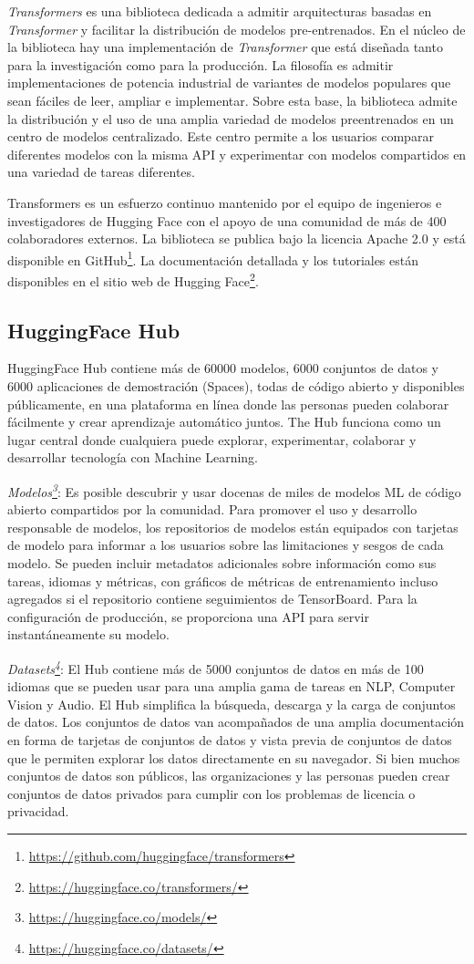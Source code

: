\textit{Transformers} es una biblioteca dedicada a admitir arquitecturas basadas en \textit{Transformer} y facilitar la distribución de modelos pre-entrenados. En el núcleo de la biblioteca hay una implementación de \textit{Transformer} que está diseñada tanto para la investigación como para la producción. La filosofía es admitir implementaciones de potencia industrial de variantes de modelos populares que sean fáciles de leer, ampliar e implementar. Sobre esta base, la biblioteca admite la distribución y el uso de una amplia variedad de modelos preentrenados en un centro de modelos centralizado. Este centro permite a los usuarios comparar diferentes modelos con la misma API y experimentar con modelos compartidos en una variedad de tareas diferentes.

Transformers es un esfuerzo continuo mantenido por el equipo de ingenieros e investigadores de Hugging Face con el apoyo de una comunidad de más de 400 colaboradores externos. La biblioteca se publica bajo la licencia Apache 2.0 y está disponible en GitHub\footnote[1]{\url{https://github.com/huggingface/transformers}}. La documentación detallada y los tutoriales están disponibles en el sitio web de Hugging Face\footnote[2]{\url{https://huggingface.co/transformers/}}.

\subsection{HuggingFace Hub}
HuggingFace Hub contiene más de 60000 modelos, 6000 conjuntos de datos y 6000 aplicaciones de demostración (Spaces), todas de código abierto y disponibles públicamente, en una plataforma en línea donde las personas pueden colaborar fácilmente y crear aprendizaje automático juntos. The Hub funciona como un lugar central donde cualquiera puede explorar, experimentar, colaborar y desarrollar tecnología con Machine Learning. 

\textit{Modelos\footnote[3]{\url{https://huggingface.co/models/}}}: Es posible descubrir y usar docenas de miles de modelos ML de código abierto compartidos por la comunidad. Para promover el uso y desarrollo responsable de modelos, los repositorios de modelos están equipados con tarjetas de modelo para informar a los usuarios sobre las limitaciones y sesgos de cada modelo. Se pueden incluir metadatos adicionales sobre información como sus tareas, idiomas y métricas, con gráficos de métricas de entrenamiento incluso agregados si el repositorio contiene seguimientos de TensorBoard. Para la configuración de producción, se proporciona una API para servir instantáneamente su modelo.

\textit{Datasets\footnote[4]{\url{https://huggingface.co/datasets/}}}: El Hub contiene más de 5000 conjuntos de datos en más de 100 idiomas que se pueden usar para una amplia gama de tareas en NLP, Computer Vision y Audio. El Hub simplifica la búsqueda, descarga y la carga de conjuntos de datos. Los conjuntos de datos van acompañados de una amplia documentación en forma de tarjetas de conjuntos de datos y vista previa de conjuntos de datos que le permiten explorar los datos directamente en su navegador. Si bien muchos conjuntos de datos son públicos, las organizaciones y las personas pueden crear conjuntos de datos privados para cumplir con los problemas de licencia o privacidad.